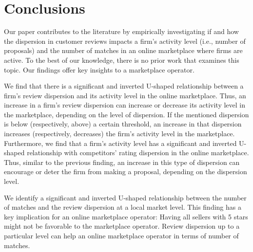\documentclass[msom,blindrev]{informs3}
\begin{document}
	
	
	
	
	
	
	
\section{Conclusions}

Our paper contributes to the literature by empirically investigating if and how the dispersion in customer reviews impacts a firm's activity level (i.e., number of proposals) and the number of matches in an online marketplace where firms are active. To the best of our knowledge, there is no prior work that examines this topic. Our findings offer key insights to a marketplace operator.

We find that there is a significant and inverted U-shaped relationship between a firm's review dispersion and its activity level in the online marketplace. Thus, an increase in a firm's review dispersion can increase or decrease its activity level in the marketplace, depending on the level of dispersion. If the mentioned dispersion is below (respectively, above) a certain threshold, an increase in that dispersion increases (respectively, decreases) the firm's activity level in the marketplace. Furthermore, we find that a firm's activity level  has a significant and inverted U-shaped relationship with competitors' rating dispersion in the online marketplace. Thus, similar to the previous finding, an increase in this type of dispersion can encourage or deter the firm from making a proposal, depending on the dispersion level.

We identify a significant and inverted U-shaped relationship between the number of matches and the review dispersion at a local market level. This finding has a key implication for an online marketplace operator: Having all sellers with 5 stars might not be favorable to the marketplace operator. Review dispersion up to a particular level can help an online marketplace operator in terms of number of matches.
\end{document}
